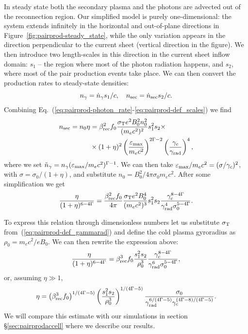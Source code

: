 In steady state both the secondary plasma and the photons are advected out of the reconnection region. Our simplified model is purely one-dimensional: the system extends infinitely in the horizontal and out-of-plane directions in Figure~\ref{fig:pairprod-steady_state}, while the only variation appears in the direction perpendicular to the current sheet (vertical direction in the figure). We then introduce two length-scales in this direction in the current sheet inflow domain: $s_1$ -- the region where most of the photon radiation happens, and $s_2$, where most of the pair production events take place. We can then convert the production rates to steady-state densities:
\begin{equation}\label{eq:pairprod-def_scales}
    n_\gamma = \dot{n}_{\gamma} s_1 / c,~~~n_{\rm sec} = \dot{n}_{\rm sec} s_2 / c.
\end{equation}
Combining Eq.~(\ref{eq:pairprod-photon_rate}-\ref{eq:pairprod-def_scales}) we find
\begin{equation}
\begin{split}
    n_{\rm sec} = n_0 \eta & =
                    \beta_{\rm rec}^2 f_0 \frac{\sigma_{\rm T} e^2 B_0^2 n_0^2}{(m_e c^2)^2} s_1^2 s_2 \times \\
                    & \times (1+\eta)^2\left(\frac{\varepsilon_{\rm max}}{m_e c^2}\right)^{2\Gamma-2}\left(\frac{\gamma_c}{\gamma_{\rm rad}}\right)^4,
\end{split}
\end{equation}
where we set $\tilde{n}_\gamma = n_{\gamma}(\varepsilon_{\rm max}/m_e c^2)^{\Gamma-1}$. We can then take $\varepsilon_{\rm max}/m_e c^2 = (\sigma/\gamma_c)^2$, with $\sigma = \sigma_0 / (1 + \eta)$, and substitute $n_0 = B_0^2 / 4\pi \sigma_0 m_e c^2$. After some simplification we get
\begin{equation}
    \frac{\eta}{(1+\eta)^{6-4\Gamma}} =
            \frac{\beta_{\rm rec}^2 f_0}{4\pi}
            \frac{\sigma_{\rm T} e^2 B_0^4}{(m_e c^2)^3}s_1^2 s_2
            \frac{\gamma_c^{8-4\Gamma}}{\gamma_{\rm rad}^4\sigma_0^{5-4\Gamma}}.
\end{equation}

To express this relation through dimensionless numbers let us substitute $\sigma_{\rm T}$ from~(\ref{eq:pairprod-def_gammarad}) and define the cold plasma gyroradius as $\rho_0 = m_e c^2 / e B_0$. We can then rewrite the expression above:
\begin{equation}\label{eq:pairprod-sim_mult_theory}
    \frac{\eta}{(1+\eta)^{6-4\Gamma}} =
            \beta_{\rm rec}^3 f_0
            \frac{s_1^2 s_2}{\rho_0^3}
            \frac{\gamma_c^{8-4\Gamma}}{\gamma_{\rm rad}^6\sigma_0^{5-4\Gamma}},
\end{equation}
or, assuming $\eta \gg 1$,
\begin{equation}\label{eq:pairprod-sim_mult_theory2}
    \eta = \left(\beta_{\rm rec}^3 f_0\right)^{1/(4\Gamma-5)}
            \left(\frac{s_1^2 s_2}{\rho_0^3}\right)^{1/(4\Gamma-5)}
            \frac{\sigma_0}{\gamma_{\rm rad}^{6/(4\Gamma-5)}\gamma_c^{(4\Gamma-8)/(4\Gamma-5)}}.
\end{equation}
We will compare this estimate with our simulations in section \S\ref{sec:pairprodaccell} where we describe our results.

